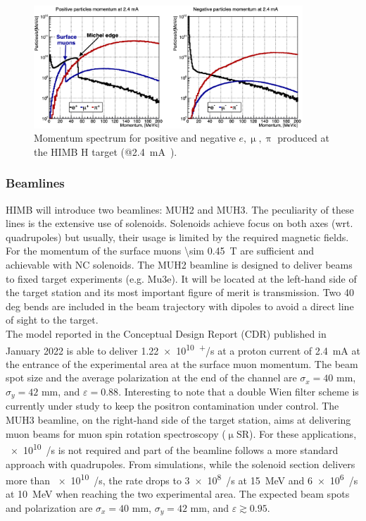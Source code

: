 \begin{refsection}
        \begin{figure}[h]
            \centering
            \includegraphics[width=0.9\textwidth]{Figures/Introduction/himb_momenta.png}
            \caption[HIMB: momentum spectra]{Momentum spectrum for positive and negative $e,\upmu,\uppi$ produced at the HIMB H target (@\SI{2.4}{mA)}.}
            \label{fig:himb:momenta}
        \end{figure}
        
        \subsubsection{Beamlines}
        HIMB will introduce two beamlines: MUH2 and MUH3.
        The peculiarity of these lines is the extensive use of solenoids.
        Solenoids achieve focus on both axes (wrt. quadrupoles) but usually, their usage is limited by the required magnetic fields. 
        For the momentum of the surface muons \SI{\sim 0.45}{T} are sufficient and achievable with NC solenoids. 
        \noindent
        The MUH2 beamline is designed to deliver beams to fixed target experiments (e.g. Mu3e). It will be located at the left-hand side of the target station and its most important figure of merit is transmission.
        Two 40 deg bends are included in the beam trajectory with dipoles to avoid a direct line of sight to the target.\\
        The model reported in the Conceptual Design Report (CDR) published in January 2022  is able to deliver \SI{1.22e10}{\upmu^+/s} at a proton current of \SI{2.4}{mA} at the entrance of the experimental area at the surface muon momentum. 
        The beam spot size and the average polarization at the end of the channel are $\sigma_x = 40$ mm, $\sigma_y = 42$ mm, and $\varepsilon = 0.88$.
        Interesting to note that a double Wien filter scheme is currently under study to keep the positron contamination under control.
        \noindent
        The MUH3 beamline, on the right-hand side of the target station, aims at delivering muon beams for muon spin rotation spectroscopy ($\upmu$SR).
        For these applications, \SI{e10}{\upmu/s} is not required and part of the beamline follows a more standard approach with quadrupoles.
        From simulations, while the solenoid section delivers more than \SI{e10}{\upmu/s}, the rate drops to \SI{3e8}{\upmu/s} at \SI{15}{MeV} and \SI{6e6}{\upmu/s} at \SI{10}{MeV} when reaching the two experimental area.
        The expected beam spots and polarization are $\sigma_x = 40$ mm, $\sigma_y = 42$ mm, and $\varepsilon\gtrsim 0.95$.
        

\end{refsection}
